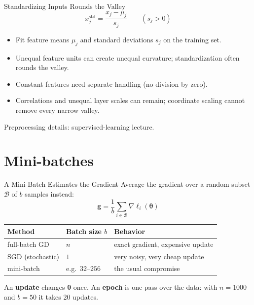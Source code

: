 \documentclass{ntuabeamer}
\begin{document}
\begin{frame}{Standardizing Inputs Rounds the Valley}
  \[\boxed{x_j^{\mathrm{std}}=\frac{x_j-\mu_j}{s_j}}\qquad(s_j>0)\]
  \begin{itemize}
    \item Fit feature means \(\mu_j\) and standard deviations \(s_j\) on the training set.
    \item Unequal feature units can create unequal curvature; standardization often rounds the valley.
    \item Constant features need separate handling (no division by zero).
    \item Correlations and unequal layer scales can remain; coordinate scaling cannot remove every narrow valley.
  \end{itemize}
  Preprocessing details: supervised-learning lecture.
\end{frame}

\section{Mini-batches}

\begin{frame}{A Mini-Batch Estimates the Gradient}
  \small
  Average the gradient over a random subset $\mathcal B$ of $b$ samples instead:
  \[
    \mathbf g=\frac1b\sum_{i\in\mathcal B}\nabla\ell_i(\boldsymbol\theta)
  \]
  \begin{center}
    \begin{tabular}{lll}
      \toprule
      \textbf{Method} & \textbf{Batch size} $b$ & \textbf{Behavior} \\
      \midrule
      full-batch GD & $n$ & exact gradient, expensive update \\
      SGD (stochastic) & $1$ & very noisy, very cheap update \\
      mini-batch & e.g.\ $32$--$256$ & the usual compromise \\
      \bottomrule
    \end{tabular}
  \end{center}
  An \textbf{update} changes $\boldsymbol\theta$ once. An \textbf{epoch} is one pass over the data:
  with $n=1000$ and $b=50$ it takes $20$ updates.
\end{frame}
\end{document}
